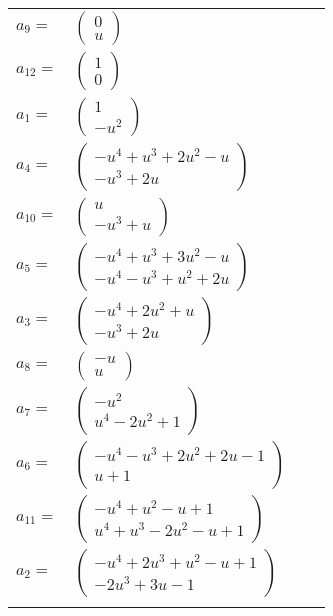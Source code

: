 \documentclass[1p]{elsarticle_modified}
\theoremstyle{definition}
\begin{document}
\begin{tabular}{m{7pt} m{180pt} m{7pt} m{180pt} }
\flushright $a_{9}=$&$\begin{pmatrix}0\\u\end{pmatrix}$ \\
\flushright $a_{12}=$&$\begin{pmatrix}1\\0\end{pmatrix}$ \\
\flushright $a_{1}=$&$\begin{pmatrix}1\\- u^2\end{pmatrix}$ \\
\flushright $a_{4}=$&$\begin{pmatrix}- u^4+u^3+2 u^2- u\\- u^3+2 u\end{pmatrix}$ \\
\flushright $a_{10}=$&$\begin{pmatrix}u\\- u^3+u\end{pmatrix}$ \\
\flushright $a_{5}=$&$\begin{pmatrix}- u^4+u^3+3 u^2- u\\- u^4- u^3+u^2+2 u\end{pmatrix}$ \\
\flushright $a_{3}=$&$\begin{pmatrix}- u^4+2 u^2+u\\- u^3+2 u\end{pmatrix}$ \\
\flushright $a_{8}=$&$\begin{pmatrix}- u\\u\end{pmatrix}$ \\
\flushright $a_{7}=$&$\begin{pmatrix}- u^2\\u^4-2 u^2+1\end{pmatrix}$ \\
\flushright $a_{6}=$&$\begin{pmatrix}- u^4- u^3+2 u^2+2 u-1\\u+1\end{pmatrix}$ \\
\flushright $a_{11}=$&$\begin{pmatrix}- u^4+u^2- u+1\\u^4+u^3-2 u^2- u+1\end{pmatrix}$ \\
\flushright $a_{2}=$&$\begin{pmatrix}- u^4+2 u^3+u^2- u+1\\-2 u^3+3 u-1\end{pmatrix}$\\&\end{tabular}
\end{document}
